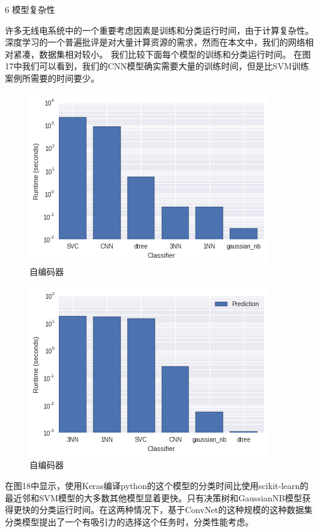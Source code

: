 6 模型复杂性\par

许多无线电系统中的一个重要考虑因素是训练和分类运行时间，由于计算复杂性。 深度学习的一个普遍批评是对大量计算资源的需求，然而在本文中，我们的网络相对紧凑，数据集相对较小。 我们比较下面每个模型的训练和分类运行时间。 在图17中我们可以看到，我们的CNN模型确实需要大量的训练时间，但是比SVM训练案例所需要的时间要少。\par
\begin{figure}[!h]
	\centering
	\includegraphics[scale=0.5]{figures/chapter_3/train_time}
	\caption{自编码器}	\label{fig_3_2}
\end{figure}
\begin{figure}[!h]
	\centering
	\includegraphics[scale=0.5]{figures/chapter_3/classify_time}
	\caption{自编码器}	\label{fig_3_2}
\end{figure}

在图18中显示，使用Keras编译python的这个模型的分类时间比使用scikit-learn的最近邻和SVM模型的大多数其他模型显着更快。只有决策树和GaussianNB模型获得更快的分类运行时间。在这两种情况下，基于ConvNet的这种规模的这种数据集分类模型提出了一个有吸引力的选择这个任务时，分类性能考虑。\par

